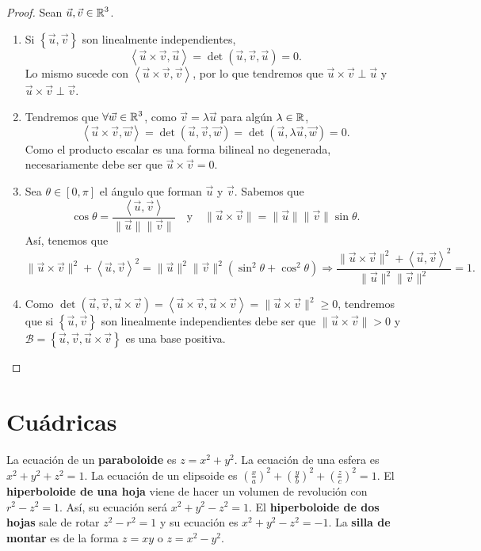 \begin{proof}
Sean $\displaystyle \vec{u}, \vec{v} \in \mathbb{R}^{3} $. 
\begin{enumerate}
	\item Si $\displaystyle \left\{ \vec{u}, \vec{v}\right\}  $ son linealmente independientes,
		\[\left\langle \vec{u}\times\vec{v}, \vec{u} \right\rangle =\det\left(\vec{u}, \vec{v}, \vec{u}\right)=0 .\]
		Lo mismo sucede con $\displaystyle \left\langle \vec{u} \times \vec{v}, \vec{v} \right\rangle  $, por lo que tendremos que $\displaystyle \vec{u} \times \vec{v} \perp \vec{u} $ y $\displaystyle \vec{u} \times \vec{v} \perp \vec{v} $. 
	\item Tendremos que $\displaystyle \forall \vec{w} \in \mathbb{R}^{3} $, como $\displaystyle \vec{v}=\lambda \vec{u} $ para algún $\displaystyle \lambda \in \mathbb{R}  $, 
		\[\left\langle \vec{u} \times \vec{v}, \vec{w} \right\rangle =\det\left(\vec{u}, \vec{v}, \vec{w}\right)=\det\left(\vec{u}, \lambda \vec{u}, \vec{w}\right)=0 .\]
	Como el producto escalar es una forma bilineal no degenerada, necesariamente debe ser que $\displaystyle \vec{u} \times \vec{v}=0 $. 
\item Sea $\displaystyle \theta  \in \left[0, \pi \right]  $ el ángulo que forman $\displaystyle \vec{u} $ y $\displaystyle \vec{v} $. Sabemos que 
		\[\cos\theta = \frac{\left\langle \vec{u}, \vec{v} \right\rangle }{\|\vec{u}\|\|\vec{v}\|}  \quad \text{y} \quad \|\vec{u} \times \vec{v}\|=\|\vec{u}\|\|\vec{v}\|\sin\theta .\]
		Así, tenemos que 
\[\|\vec{u} \times \vec{v}\|^{2} + \left\langle \vec{u}, \vec{v} \right\rangle ^{2}= \|\vec{u}\|^{2}\|\vec{v}\|^{2}\left(\sin ^{2}\theta + \cos^{2}\theta \right) \Rightarrow \frac{\|\vec{u} \times \vec{v}\|^{2}+\left\langle \vec{u}, \vec{v} \right\rangle ^{2}}{\|\vec{u}\|^{2}\|\vec{v}\|^{2}} 
=1.\]
\item Como $\displaystyle \det\left(\vec{u}, \vec{v}, \vec{u} \times \vec{v}\right)=\left\langle \vec{u} \times \vec{v}, \vec{u}\times\vec{v} \right\rangle =\|\vec{u} \times \vec{v}\|^{2} \geq 0 $, tendremos que si $\displaystyle \left\{ \vec{u}, \vec{v}\right\}  $ son linealmente independientes debe ser que $\displaystyle \|\vec{u} \times \vec{v}\| > 0 $ y $\displaystyle \mathcal{B}= \left\{ \vec{u}, \vec{v}, \vec{u} \times \vec{v}\right\}  $ es una base positiva.
\end{enumerate}
\end{proof}

\chapter{Cuádricas}
La ecuación de un \textbf{paraboloide} es $\displaystyle z = x^{2} +y^{2} $. La ecuación de una esfera es $\displaystyle x^{2} +y^{2} + z^{2} = 1 $. La ecuación de un elipsoide es $\displaystyle \left(\frac{x}{a}\right)^{2} + \left(\frac{y}{b}\right)^{2} + \left(\frac{z}{c}\right)^{2} = 1 $. El \textbf{hiperboloide de una hoja} viene de hacer un volumen de revolución con $\displaystyle r^{2}-z^{2} = 1 $. Así, su ecuación será $\displaystyle x^{2} +y^{2}-z^{2}=1 $. El \textbf{hiperboloide de dos hojas} sale de rotar $\displaystyle z^{2}-r^{2}=1 $ y su ecuación es $\displaystyle x^{2}+y^{2}-z^{2}=-1 $. 
La \textbf{silla de montar} es de la forma $\displaystyle z = xy $ o $\displaystyle z = x^{2}-y^{2} $. 
